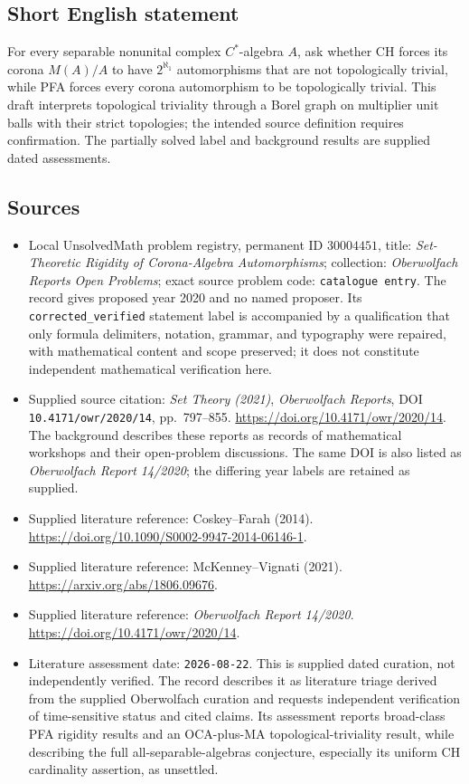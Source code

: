 \documentclass[11pt]{article}
\begin{document}
\subsection{Short English statement}
For every separable nonunital complex \(C^*\)-algebra \(A\), ask whether CH forces its corona \(M(A)/A\) to have \(2^{\aleph_1}\) automorphisms that are not topologically trivial, while PFA forces every corona automorphism to be topologically trivial. This draft interprets topological triviality through a Borel graph on multiplier unit balls with their strict topologies; the intended source definition requires confirmation. The partially solved label and background results are supplied dated assessments.
\subsection{Sources}
\begin{itemize}
\item Local UnsolvedMath problem registry, permanent ID \(30004451\), title: \emph{Set-Theoretic Rigidity of Corona-Algebra Automorphisms}; collection: \emph{Oberwolfach Reports Open Problems}; exact source problem code: \texttt{catalogue entry}. The record gives proposed year 2020 and no named proposer. Its \texttt{corrected\_verified} statement label is accompanied by a qualification that only formula delimiters, notation, grammar, and typography were repaired, with mathematical content and scope preserved; it does not constitute independent mathematical verification here.
\item Supplied source citation: \emph{Set Theory (2021)}, \emph{Oberwolfach Reports}, DOI \texttt{10.4171/owr/2020/14}, pp.\ 797--855. \url{https://doi.org/10.4171/owr/2020/14}. The background describes these reports as records of mathematical workshops and their open-problem discussions. The same DOI is also listed as \emph{Oberwolfach Report 14/2020}; the differing year labels are retained as supplied.
\item Supplied literature reference: Coskey--Farah (2014). \url{https://doi.org/10.1090/S0002-9947-2014-06146-1}.
\item Supplied literature reference: McKenney--Vignati (2021). \url{https://arxiv.org/abs/1806.09676}.
\item Supplied literature reference: \emph{Oberwolfach Report 14/2020}. \url{https://doi.org/10.4171/owr/2020/14}.
\item Literature assessment date: \texttt{2026-08-22}. This is supplied dated curation, not independently verified. The record describes it as literature triage derived from the supplied Oberwolfach curation and requests independent verification of time-sensitive status and cited claims. Its assessment reports broad-class PFA rigidity results and an OCA-plus-MA topological-triviality result, while describing the full all-separable-algebras conjecture, especially its uniform CH cardinality assertion, as unsettled.
\end{itemize}
\end{document}

